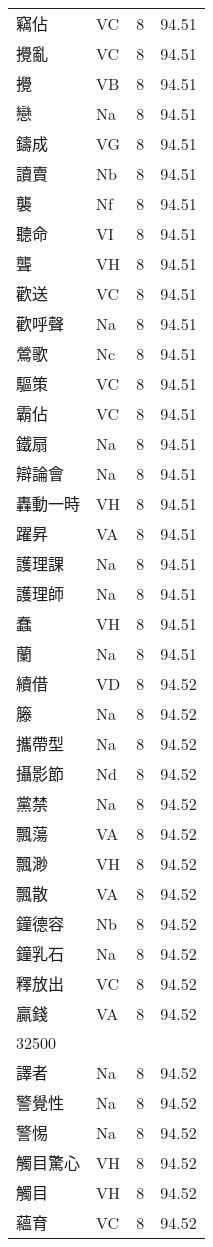 \documentclass[twocolumn]{book}
\begin{document}
\begin{supertabular}{llrr}
竊佔 & VC & 8 &  94.51\\
攪亂 & VC & 8 &  94.51\\
攪 & VB & 8 &  94.51\\
戀 & Na & 8 &  94.51\\
鑄成 & VG & 8 &  94.51\\
讀賣 & Nb & 8 &  94.51\\
襲 & Nf & 8 &  94.51\\
聽命 & VI & 8 &  94.51\\
聾 & VH & 8 &  94.51\\
歡送 & VC & 8 &  94.51\\
歡呼聲 & Na & 8 &  94.51\\
鶯歌 & Nc & 8 &  94.51\\
驅策 & VC & 8 &  94.51\\
霸佔 & VC & 8 &  94.51\\
鐵扇 & Na & 8 &  94.51\\
辯論會 & Na & 8 &  94.51\\
轟動一時 & VH & 8 &  94.51\\
躍昇 & VA & 8 &  94.51\\
護理課 & Na & 8 &  94.51\\
護理師 & Na & 8 &  94.51\\
蠢 & VH & 8 &  94.51\\
蘭 & Na & 8 &  94.51\\
續借 & VD & 8 &  94.52\\
籐 & Na & 8 &  94.52\\
攜帶型 & Na & 8 &  94.52\\
攝影節 & Nd & 8 &  94.52\\
黨禁 & Na & 8 &  94.52\\
飄蕩 & VA & 8 &  94.52\\
飄渺 & VH & 8 &  94.52\\
飄散 & VA & 8 &  94.52\\
鐘德容 & Nb & 8 &  94.52\\
鐘乳石 & Na & 8 &  94.52\\
釋放出 & VC & 8 &  94.52\\
贏錢 & VA & 8 &  94.52\\
32500\\
譯者 & Na & 8 &  94.52\\
警覺性 & Na & 8 &  94.52\\
警惕 & Na & 8 &  94.52\\
觸目驚心 & VH & 8 &  94.52\\
觸目 & VH & 8 &  94.52\\
蘊育 & VC & 8 &  94.52\\

\end{supertabular}
\end{document}
